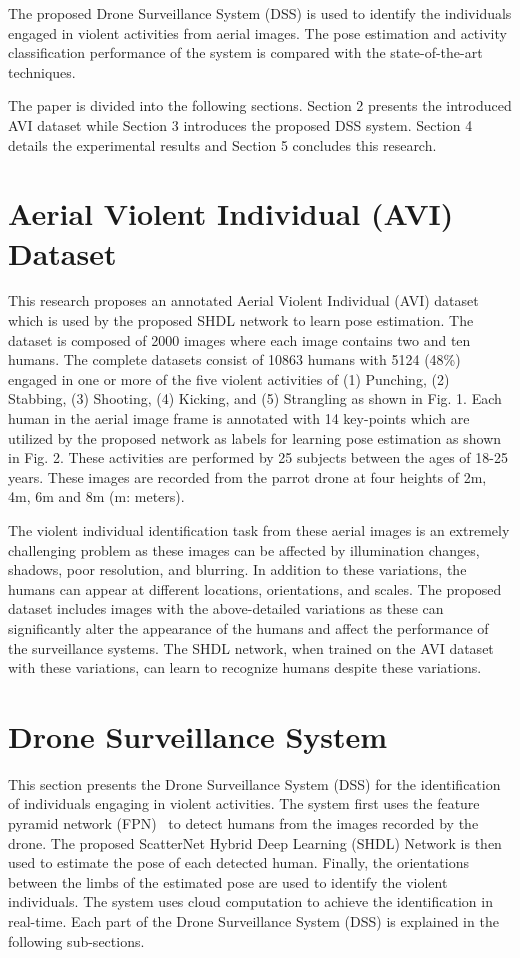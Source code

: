 \documentclass[10pt,twocolumn,letterpaper]{article}
\begin{document}
The proposed Drone Surveillance System (DSS) is used to identify the individuals engaged in violent activities from aerial images. The pose estimation and activity classification performance of the system is compared with the state-of-the-art techniques.

The paper is divided into the following sections. Section 2 presents the introduced AVI dataset while Section 3 introduces the proposed DSS system. Section 4 details the experimental results and Section 5 concludes this research.
\section{Aerial Violent Individual (AVI) Dataset}
This research proposes an annotated Aerial Violent Individual (AVI) dataset which is used by the proposed SHDL network to learn pose estimation. The dataset is composed of 2000 images where each image contains two and ten humans. The complete datasets consist of 10863 humans with 5124 (48\%) engaged in one or more of the five violent activities of  (1) Punching, (2) Stabbing, (3) Shooting, (4) Kicking, and (5) Strangling as shown in Fig. 1. Each human in the aerial image frame is annotated with 14 key-points which are utilized by the proposed network as labels for learning pose estimation as shown in Fig. 2. These activities are performed by 25 subjects between the ages of 18-25 years. These images are recorded from the parrot drone at four heights of 2m, 4m, 6m and 8m (m: meters). 

The violent individual identification task from these aerial images is an extremely challenging problem as these images can be affected by illumination changes, shadows, poor resolution, and blurring. In addition to these variations, the humans can appear at different locations, orientations, and scales. The proposed dataset includes images with the above-detailed variations as these can significantly alter the appearance of the humans and affect the performance of the surveillance systems. The SHDL network, when trained on the AVI dataset with these variations, can learn to recognize humans despite these variations. 

\section{Drone Surveillance System}
This section presents the Drone Surveillance System (DSS) for the identification of individuals engaging in violent activities. The system first uses the feature pyramid network (FPN)~\cite{hd} to detect humans from the images recorded by the drone. The proposed ScatterNet Hybrid Deep Learning (SHDL) Network is then used to estimate the pose of each detected human. Finally, the orientations between the limbs of the estimated pose are used to identify the violent individuals. The system uses cloud computation to achieve the identification in real-time. Each part of the Drone Surveillance System (DSS) is explained in the following sub-sections.
\end{document}
